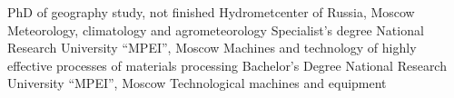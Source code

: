 \documentclass[11pt]{developercv} %
\begin{document}


\begin{entrylist}
    {PhD of geography study, not finished}
    {Hydrometcenter of Russia, Moscow}
    {Meteorology, climatology and agrometeorology}
    {Specialist's degree}
    {National Research University ``MPEI'', Moscow}
    {Machines and technology of highly effective processes of materials processing}
    {Bachelor's Degree}
    {National Research University ``MPEI'', Moscow}
    {Technological machines and equipment}
\end{entrylist}
\pagebreak


\end{document}
